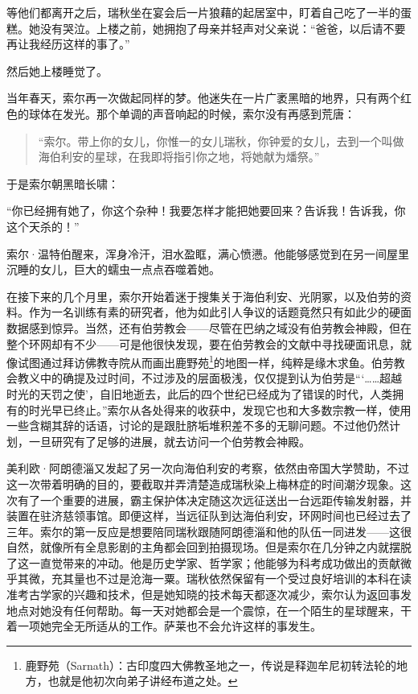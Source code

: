 \documentclass[AutoFakeBold=true]{book}
\begin{document}
等他们都离开之后，瑞秋坐在宴会后一片狼藉的起居室中，盯着自己吃了一半的蛋糕。她没有哭泣。上楼之前，她拥抱了母亲并轻声对父亲说：``爸爸，以后请不要再让我经历这样的事了。''

然后她上楼睡觉了。

\vspace*{1em}

当年春天，索尔再一次做起同样的梦。他迷失在一片广袤黑暗的地界，只有两个红色的球体在发光。那个单调的声音响起的时候，索尔没有再感到荒唐：

\begin{quotation}
	{\kaishu ``索尔。带上你的女儿，你惟一的女儿瑞秋，你钟爱的女儿，去到一个叫做海伯利安的星球，在我即将指引你之地，将她献为燔祭。''}
\end{quotation}

于是索尔朝黑暗长啸：

``你已经拥有她了，你这个杂种！我要怎样才能把她要回来？告诉我！告诉我，你这个天杀的！''

索尔·温特伯醒来，浑身冷汗，泪水盈眶，满心愤懑。他能够感觉到在另一间屋里沉睡的女儿，巨大的蠕虫一点点吞噬着她。

\vspace*{1em}

在接下来的几个月里，索尔开始着迷于搜集关于海伯利安、光阴冢，以及伯劳的资料。作为一名训练有素的研究者，他为如此引人争议的话题竟然只有如此少的硬面数据感到惊异。当然，还有伯劳教会——尽管在巴纳之域没有伯劳教会神殿，但在整个环网却有不少——可是他很快发现，要在伯劳教会的文献中寻找硬面讯息，就像试图通过拜访佛教寺院从而画出鹿野苑\footnote{鹿野苑（Sarnath）：古印度四大佛教圣地之一，传说是释迦牟尼初转法轮的地方，也就是他初次向弟子讲经布道之处。}的地图一样，纯粹是缘木求鱼。伯劳教会教义中的确提及过时间，不过涉及的层面极浅，仅仅提到认为伯劳是```……超越时光的天罚之使'，自旧地逝去，此后的四个世纪已经成为了错误的时代，人类拥有的时光早已终止。''索尔从各处得来的收获中，发现它也和大多数宗教一样，使用一些含糊其辞的话语，讨论的是跟肚脐垢堆积差不多的无聊问题。不过他仍然计划，一旦研究有了足够的进展，就去访问一个伯劳教会神殿。

美利欧·阿朗德淄又发起了另一次向海伯利安的考察，依然由帝国大学赞助，不过这一次带着明确的目的，要截取并弄清楚造成瑞秋染上梅林症的时间潮汐现象。这次有了一个重要的进展，霸主保护体决定随这次远征送出一台远距传输发射器，并装置在驻济慈领事馆。即便这样，当远征队到达海伯利安，环网时间也已经过去了三年。索尔的第一反应是想要陪同瑞秋跟随阿朗德淄和他的队伍一同进发——这很自然，就像所有全息影剧的主角都会回到拍摄现场。但是索尔在几分钟之内就摆脱了这一直觉带来的冲动。他是历史学家、哲学家；他能够为科考成功做出的贡献微乎其微，充其量也不过是沧海一粟。瑞秋依然保留有一个受过良好培训的本科在读准考古学家的兴趣和技术，但是她知晓的技术每天都逐次减少，索尔认为返回事发地点对她没有任何帮助。每一天对她都会是一个震惊，在一个陌生的星球醒来，干着一项她完全无所适从的工作。萨莱也不会允许这样的事发生。
\end{document}
